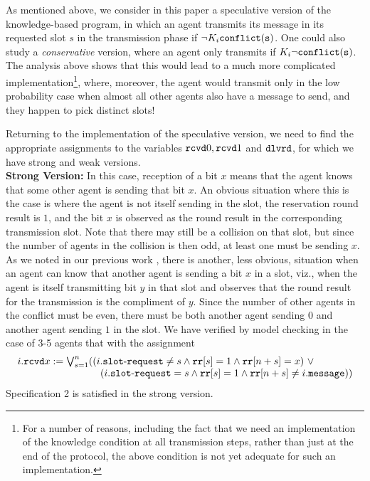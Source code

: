 \documentclass[]{llncs}
\newcommand{\dlvrd}{{\tt dlvrd}}
\newcommand{\rr}{{\tt rr}}
\newcommand{\rcvd}{{\tt rcvd}}
\newcommand{\slotrequest}{{\tt slot\mbox{-}request}}
\newcommand{\msg}{{\tt message}}
\newcommand{\conflict}{\tt conflict}
\begin{document}
As mentioned above, we consider in this paper a speculative version of the knowledge-based program, in which an  agent 
transmits its message in its requested slot $s$ in the transmission phase if $\neg K_i \conflict(s)$. 
One could also study a {\em conservative} version, where an agent only transmits if 
$K_i \neg \conflict(s)$. The analysis above shows that this would lead to a much more complicated implementation\footnote{For 
a number of reasons, including the fact that we need an implementation of the knowledge condition at all transmission 
steps, rather than just at the end of the protocol, the above condition is not yet adequate for such an implementation.}, where,
moreover, the agent would transmit only in the low probability case when almost all other agents also have a message to send, and
they happen to pick distinct slots!

Returning to the implementation of the speculative version, 
we need to find the appropriate assignments to the variables $\rcvd0, \rcvd1$ and $\dlvrd$, for which 
we have strong and weak versions. \\

\noindent
{\bf Strong Version:} In this case, reception of a bit $x$ means that the agent knows that some other agent is sending 
that bit $x$. An obvious situation where this is the case is where the agent is not itself sending in the slot, 
the reservation round result is $1$, and the bit $x$ is observed as the round result in the corresponding transmission slot. 
Note that there may still be a collision on that slot, but since the number of agents in the collision is
then odd, at least one must be sending $x$.  As we noted in our previous work \cite{AlBatainehMeyden10}, 
there is another, less obvious, situation when an 
agent can know that another agent is sending a bit $x$ in a slot, viz., when the agent is itself transmitting bit $y$ in that slot and observes that the 
round result for the transmission  is the compliment of $y$. Since the number of other agents in the conflict must be 
even, there must be both another agent sending $0$ and another agent sending $1$ in the slot. 
We have verified by model checking in the case of 3-5 agents that with the assignment
$$
\begin{array}[t]{l}
i.\rcvd x : = \bigvee_{s=1}^n ((i.\slotrequest \neq s \land \rr[s] =1 \land \rr[n+s] =x) ~ \lor \\ 
~~~~~~~~~~~~~~~~~~~~~~~~~(i.\slotrequest =s\land   \rr[s] =1\land  \rr[n+s]\neq i.\msg) )
\end{array} 
 $$
Specification 2 is satisfied in the strong version. 
\end{document}
